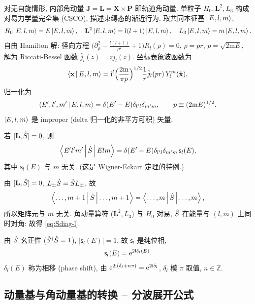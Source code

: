 对无自旋情形, 内部角动量 $\mathbf{J}=\mathbf{L}=\mathbf{X}\times\mathbf{P}$ 即轨道角动量. 单粒子 $H_0,\mathbf{L}^2,L_3$ 构成对易力学量完全集 (CSCO), 描述束缚态的渐近行为. 取共同本征基 $\ket{E,l,m}$,
\begin{equation}
H_0\ket{E,l,m}=E\ket{E,l,m},\quad \mathbf{L}^2\ket{E,l,m}=l(l+1)\ket{E,l,m},\quad L_3\ket{E,l,m}=m\ket{E,l,m}.
\end{equation}
自由 Hamilton 解: 径向方程 $\bigl(\partial_\rho^2 -\frac{l(l+1)}{\rho^2}+1\bigr)R_l(\rho)=0$, $\rho=pr$, $p=\sqrt{2\mathrm{m}E}$, 解为 Riccati-Bessel 函数 $\hat{j}_l(z)=z j_l(z)$. 坐标表象波函数为
\begin{equation}
\left\langle \mathbf{x} \,\middle|\, E,l,m \right\rangle=\mathrm{i}^l\Bigl(\frac{2\mathrm{m}}{\pi p}\Bigr)^{1/2}\frac{1}{r}\hat{j}_l(pr)\,Y_l^m(\hat{\mathbf{x}}),
\end{equation}
归一化为
\[
\left\langle E',l',m' \,\middle|\, E,l,m \right\rangle=\delta(E'-E)\delta_{l'l}\delta_{m'm},\qquad p\equiv (2\mathrm{m}E)^{1/2}.
\]
$\ket{E,l,m}$ 是 improper (delta 归一化的非平方可积) 矢量.

\begin{theorem}\label{thm:S-diag}
若 $[\mathbf{L},\hat{S}]=0$, 则
\begin{equation}\label{eq:Sdiag-l}
\left\langle E'l'm' \,\middle|\, \hat{S} \,\middle|\, Elm \right\rangle=\delta(E'-E)\delta_{l'l}\delta_{m'm}\,\mathsf{s}_l(E),
\end{equation}
其中 $\mathsf{s}_l(E)$ 与 $m$ 无关. (这是 Wigner-Eckart 定理的特例.)
\end{theorem}

\begin{proof*}
由 $[\mathbf{L},\hat{S}]=0$, $L_\pm \hat{S}=\hat{S} L_\pm$, 故
\[
\left\langle \ldots,m+1 \,\middle|\, \hat{S} \,\middle|\, \ldots,m+1 \right\rangle=\left\langle \ldots,m \,\middle|\, \hat{S} \,\middle|\, \ldots,m \right\rangle,
\]
所以矩阵元与 $m$ 无关. 角动量算符 ($\mathbf{L}^2,L_3$) 与 $H_0$ 对易, $\hat{S}$ 在能量与 $(l,m)$ 上同时对角: 故得 \eqref{eq:Sdiag-l}.
\end{proof*}

由 $\hat{S}$ 幺正性 ($\hat{S}^\dagger \hat{S}=1$), $|\mathsf{s}_l(E)|=1$, 故 $\mathsf{s}_l$ 是纯位相,
\begin{equation}\label{eq:phaseshift}
\mathsf{s}_l(E)=\mathrm{e}^{2\mathrm{i} \delta_l(E)}.
\end{equation}
$\delta_l(E)$ 称为相移 (phase shift), 由 $\mathrm{e}^{2\mathrm{i}(\delta_l+n\pi)}=\mathrm{e}^{2\mathrm{i}\delta_l}$, $\delta_l$ 模 $\pi$ 取值, $n\in \mathbb{Z}$.

\subsection{动量基与角动量基的转换 -- 分波展开公式}

